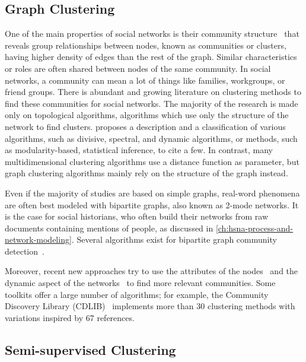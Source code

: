 \subsection{Graph Clustering}

One of the main properties of social networks is their community structure~\cite{girvanCommunityStructureSocial2002} that reveals group relationships between nodes, known as communities or clusters, having higher density of edges than the rest of the graph. Similar characteristics or roles are often shared between nodes of the same community.
In social networks, a community can mean a lot of things like families, workgroups, or friend groups. There is abundant and growing literature on clustering methods to find these communities for social networks. The majority of the research is made only on topological algorithms, \ie algorithms which use only the structure of the network to find clusters. \cite{fortunatoCommunityDetectionGraphs2010} proposes a description and a classification of various algorithms, such as divisive, spectral, and dynamic algorithms, or methods, such as modularity-based, statistical inference, to cite a few.
In contrast, many multidimensional clustering algorithms use a distance function as parameter, but graph clustering algorithms mainly rely on the structure of the graph instead.

Even if the majority of studies are based on simple graphs, real-word phenomena are often best modeled with bipartite graphs, also known as 2-mode networks. It is the case for social historians, who often build their networks from raw documents containing mentions of people, as discussed in \autoref{ch:hsna-process-and-network-modeling}. Several algorithms exist for bipartite graph community detection~\cite{alzahraniCommunityDetectionBipartite2016}.

Moreover, recent new approaches try to use the attributes of the nodes~\cite{yangCommunityDetectionNetworks2013} and the dynamic aspect of the networks~\cite{rossettiCommunityDiscoveryDynamic2018} to find more relevant communities. Some toolkits offer a large number of algorithms; for example, the Community Discovery Library (CDLIB)~\cite{rossettiCDLIBPythonLibrary2019} implements more than 30 clustering methods with variations inspired by 67 references.


\subsection{Semi-supervised Clustering}\label{sec:semisupervised}

